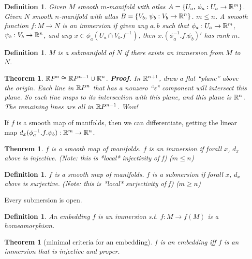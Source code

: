 \documentclass[11pt,leqno,oneside]{amsart}
\theoremstyle{mystyle} \newtheorem{thrm}[thm]{Theorem}
\theoremstyle{mystyle} \newtheorem{defi}[thm]{Definition}
\begin{document}
\begin{defi}
	Given $M$ smooth $m$-manifold with atlas $A = \{ U_a, \,\phi_a : U_a \to {\mathbb R}^m \}$.
	Given $N$ smooth $n$-manifold with atlas $B = \{ V_b, \,\psi_b : V_b \to {\mathbb R}^n \}$.
	$m \leq n$.
	A smooth function $f : M \to N$  is an \emph{immersion} if given any $a, b$ such that $\phi_a: U_a \to {\mathbb R}^m$, $\psi_b: V_b \to {\mathbb R}^n$, and any $x \in \phi_a(U_a \cap V_b.f^{-1})$, then $x.(\phi_a^{-1}.f.\psi_b)'$ has rank $m$.
\end{defi}

\begin{defi}
	$M$ is a \emph{submanifold} of $N$ if there exists an immersion from $M$ to $N$.
\end{defi}

\begin{thrm}
	${\mathbb R} P^n \mathrel{\cong} {\mathbb R} P^{n-1} \cup {\mathbb R}^n$.
	\textbf{Proof.}  In ${\mathbb R}^{n+1}$, draw a flat ``plane'' above the origin.  Each line in ${\mathbb R} P^n$ that has a nonzero ``z'' component will intersect this plane.  So each line maps to its intersection with this plane, and this plane is ${\mathbb R}^n$.  The remaining lines are all in ${\mathbb R} P^{n-1}$.  Wow!
\end{thrm}



If $f$ is a smooth map of manifolds, then we can differentiate, getting the linear map $d_x(\phi_a^{-1}.f.\psi_b): {\mathbb R}^m \to {\mathbb R}^n$.

\begin{thrm}
	$f$ is a smooth map of manifolds.
	$f$ is an \emph{immersion} if forall $x$, $d_x$ above is injective.  (Note: this is *local* injectivity of f) ($m \leq n$)
\end{thrm}

\begin{defi}
	$f$ is a smooth map of manifolds.
	$f$ is a \emph{submersion} if forall $x$, $d_x$ above is surjective.  (Note: this is *local* surjectivity of f) ($m \geq n$)
\end{defi}
\begin{prop}
	Every submersion is open.
\end{prop}

\begin{defi}
	An \emph{embedding} $f$ is an immersion s.t. $f : M \to f(M)$ is a homeomorphism.
\end{defi}
\begin{thrm}[minimal criteria for an embedding]
	$f$ is an \emph{embedding} iff $f$ is an immersion that is injective and proper.
\end{thrm}
\end{document}
